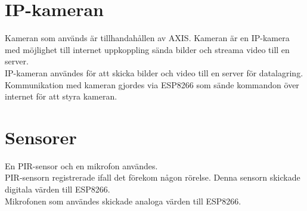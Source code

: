 \section{IP-kameran}
Kameran som används är tillhandahållen av AXIS. Kameran är en IP-kamera med möjlighet till internet uppkoppling sända bilder och streama video till en server.\\

IP-kameran användes för att skicka bilder och video till en server för datalagring.\\

Kommunikation med kameran gjordes via ESP8266 som sände kommandon över internet för att styra kameran.\\

\section{Sensorer}
En PIR-sensor och en mikrofon användes.\\

PIR-sensorn registrerade ifall det förekom någon rörelse. Denna sensorn skickade digitala värden till ESP8266.\\

Mikrofonen som användes skickade analoga värden till ESP8266.\\






 






